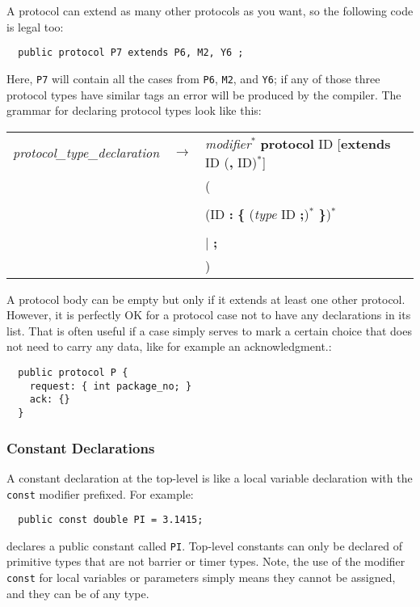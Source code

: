 \documentclass[pdflatex,11pt,letter]{article}
\begin{document}
A protocol can extend as many other protocols as you want, so the following code is legal too:
\begin{verbatim}
  public protocol P7 extends P6, M2, Y6 ;
\end{verbatim}
Here, {\tt P7} will contain all the cases from {\tt P6}, {\tt M2}, and {\tt Y6}; if any of those three protocol types have similar tags an error will be produced by the compiler. The grammar for declaring protocol types look like this:

\begin{center}
\begin{tabular}{lll}
{\it protocol\_type\_declaration} & $\rightarrow$ &
{\it modifier}$^*$ {\bf protocol} ID [{\bf extends} ID ({\bf ,} ID)$^*$] \\
&& (\\
&& \quad{\bf \{}\\
&& \quad\quad(ID {\bf :} {\bf \{} ({\it type} ID {\bf ;})$^*$ {\bf \}})$^*$\\
&& \quad{\bf \}}\\
&& $\mid$ {\bf ;}\\
&& )\\
\end{tabular}
\end{center}
A protocol body can be empty but only if it extends at least one other protocol. However, it is perfectly OK for a protocol case not to have any declarations in its list. That is often useful if a case simply serves to mark a certain choice that does not need to carry any data, like for example an acknowledgment.:
\begin{verbatim}
  public protocol P {
    request: { int package_no; }
    ack: {}
  }
\end{verbatim}


\subsubsection{Constant Declarations}

A constant declaration at the top-level is like a local variable declaration with the {\tt const} modifier prefixed. For example:
\begin{verbatim}
  public const double PI = 3.1415;
\end{verbatim}
declares a public constant called {\tt PI}. Top-level constants can only be declared of primitive types that are not barrier or timer types. Note, the use of the modifier {\tt const} for local variables or parameters simply means they cannot be assigned, and they can be of any type.
\end{document}
